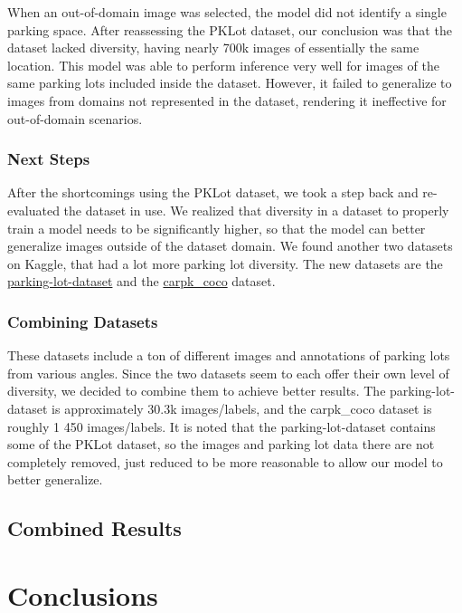 \documentclass[12pt, letterpaper, oneside]{article}
\begin{document}
When an out-of-domain image was selected, the model did not identify a single parking space. After reassessing the PKLot dataset, our conclusion was that the dataset lacked diversity, having nearly 700k images of essentially the same location. This model was able to perform inference very well for images of the same parking lots included inside the dataset. However, it failed to generalize to images from domains not represented in the dataset, rendering it ineffective for out-of-domain scenarios.

\subsubsection{Next Steps}

After the shortcomings using the PKLot dataset, we took a step back and re-evaluated the dataset in use. We realized that diversity in a dataset to properly train a model needs to be significantly higher, so that the model can better generalize images outside of the dataset domain. We found another two datasets on Kaggle, that had a lot more parking lot diversity. The new datasets are the \href{https://www.kaggle.com/datasets/muhwira/parking-lot-dataset}{parking-lot-dataset} and the \href{https://www.kaggle.com/datasets/trainingdatapro/parking-space-detection-dataset}{carpk\_coco} dataset. 

\subsubsection{Combining Datasets}
These datasets include a ton of different images and annotations of parking lots from various angles. Since the two datasets seem to each offer their own level of diversity, we decided to combine them to achieve better results. The parking-lot-dataset is approximately 30.3k images/labels, and the carpk\_coco dataset is roughly 1 450 images/labels. It is noted that the parking-lot-dataset contains some of the PKLot dataset, so the images and parking lot data there are not completely removed, just reduced to be more reasonable to allow our model to better generalize.

\subsection{Combined Results}


\section{Conclusions}
\label{sec:conc}
\end{document}
